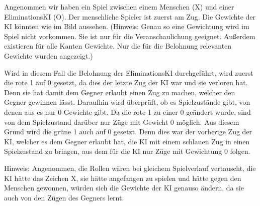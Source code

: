 \documentclass[titlepage]{scrartcl}
\begin{document}
Angenommen wir haben ein Spiel zwischen einem Menschen (X) und einer EliminationsKI (O). Der menschliche Spieler ist zuerst am Zug. Die Gewichte der KI könnten wie im Bild aussehen. (Hinweis: Genau so eine Gewichtung wird im Spiel nicht vorkommen. Sie ist nur für die Veranschaulichung geeignet. Außerdem existieren für alle Kanten Gewichte. Nur die für die Belohnung relevanten Gewichte wurden angezeigt.) 

Wird in diesem Fall die Belohnung der EliminationsKI durchgeführt, wird zuerst die rote 1 auf 0 gesetzt, da dies der letzte Zug der KI war und sie verloren hat. Denn sie hat damit dem Gegner erlaubt einen Zug zu machen, welcher den Gegner gewinnen lässt. Daraufhin wird überprüft, ob es Spielzustände gibt, von denen aus es nur 0-Gewichte gibt. Da die rote 1 zu einer 0 geändert wurde, sind von dem Spielzustand darüber nur Züge mit Gewicht 0 möglich. Aus diesem Grund wird die grüne 1 auch auf 0 gesetzt. Denn dies war der vorherige Zug der KI, welcher es dem Gegner erlaubt hat, die KI mit einem schlauen Zug in einen Spielzustand zu bringen, aus dem für die KI nur Züge mit Gewichtung 0 folgen. 

Hinweis: Angenommen, die Rollen wären bei gleichem Spielverlauf vertauscht, die KI hätte das Zeichen X, sie hätte angefangen zu spielen und hätte gegen den Menschen gewonnen, würden sich die Gewichte der KI genauso ändern, da sie auch von den Zügen des Gegners lernt. 
\end{document}
